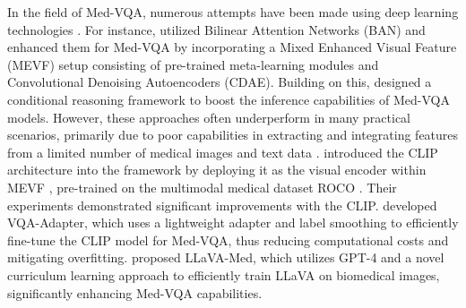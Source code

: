\documentclass[11pt]{article}
\begin{document}
In the field of Med-VQA, numerous attempts have been made using deep learning technologies \cite{tiong2022plug, banerjee2020weaqa, changpinyo2022all, liu2023chatgpt, gai2024medthink}.
For instance, \citet{nguyen2019overcoming} utilized Bilinear Attention Networks (BAN) \cite{kim2018bilinear} and enhanced them for Med-VQA by incorporating a Mixed Enhanced Visual Feature (MEVF) setup consisting of pre-trained meta-learning modules and Convolutional Denoising Autoencoders (CDAE). Building on this, \citet{zhan2020medical} designed a conditional reasoning framework to boost the inference capabilities of Med-VQA models. However, these approaches often underperform in many practical scenarios, primarily due to poor capabilities in extracting and integrating features from a limited number of medical images and text data \cite{eslami2021does, song2022clip, wang2022clip}.
\citet{eslami2021does} introduced the CLIP architecture into the framework by deploying it as the visual encoder within MEVF \cite{nguyen2019overcoming}, pre-trained on the multimodal medical dataset ROCO \cite{pelka2018radiology}. Their experiments demonstrated significant improvements with the CLIP. \citet{liu2023parameter} developed VQA-Adapter, which uses a lightweight adapter and label smoothing to efficiently fine-tune the CLIP model for Med-VQA, thus reducing computational costs and mitigating overfitting.
\citet{li2024llava} proposed LLaVA-Med, which utilizes GPT-4 and a novel curriculum learning approach to efficiently train LLaVA on biomedical images, significantly enhancing Med-VQA capabilities.
\end{document}
